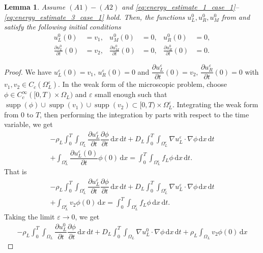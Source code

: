 \documentclass[11pt]{article}
\newtheorem{lemma}{Lemma}
\def\es{\varepsilon}
\def\oll{\Omega_L^\varepsilon}
\newcommand{\di}[1]{\,\mathrm{d}#1}
\begin{document}
\begin{lemma}\label{lemma:initial_condition}
     Assume $(A1)-(A2)$ and \eqref{eq:energy_estimate_1_case_1}--\eqref{eq:energy_estimate_3_case_1} hold. Then,  the functions $u_L^0,u_R^0,u_M^0$ from  and  satisfy the following initial conditions
    \begin{align*}
u_L^0(0) &= v_1, &
u_M^0(0) &= 0, &
u_R^0(0) &= 0, \\
\frac{\partial u_L^0}{\partial t}(0) &= v_2, &
\frac{\partial u_M^0}{\partial t}(0) &= 0, &
\frac{\partial u_R^0}{\partial t}(0) &= 0.
\end{align*}

\end{lemma}
\begin{proof}
    We have $u_L^\es(0)=v_1,\,u_R^\es(0)=0$ and $\dfrac{\partial u_L^\es}{\partial t}(0)=v_2, \,\dfrac{\partial u_R^\es}{\partial t}(0)=0$
    with $v_1,v_2\in C_c(\oll)$. In the weak form of the microscopic problem, choose $\phi\in C_c^\infty([0,T)\times \Omega_L)$ and  $\es$ small enough such that $\operatorname{supp}( \phi)\cup \operatorname{supp}( v_1)\cup \operatorname{supp}(v_2)\subset [0,T)\times \Omega_L^\es$. Integrating the weak form from $0$ to $T$, then performing the integration by parts with respect to the time variable, we get
    \begin{multline*}
    -\rho_L\int_0^T\int_{\oll}  \dfrac{\partial u_L^\es}{\partial t} \dfrac{\partial \phi}{\partial t} \di{x}\di{t}
    +D_L\int_0^T\int_{\oll}\nabla u_L^\es \cdot \nabla \phi   \di{x}\di{t} \\+\int_{\oll}  \dfrac{\partial u_L^\es(0)}{\partial t}  \phi(0)\di{x}
    = \int_0^T\int_{\oll} f_L\phi \di{x}\di{t}.
\end{multline*}
That is
\begin{multline}\label{eq:omega_l_weakform}
    -\rho_L\int_0^T\int_{\oll}  \dfrac{\partial u_L^\es}{\partial t} \dfrac{\partial \phi}{\partial t} \di{x}\di{t}
    +D_L\int_0^T\int_{\oll}\nabla u_L^\es \cdot \nabla \phi  \di{x}\di{t} \\+\int_{\oll}  v_2  \phi(0)\di{x}
    = \int_0^T\int_{\oll} f_L\phi \di{x}\di{t}.
\end{multline}
Taking the limit $\es\rightarrow 0$, we get
\begin{align*}
    -\rho_L\int_0^T\int_{\Omega_L}  \dfrac{\partial u_L^0}{\partial t} \dfrac{\partial \phi}{\partial t} \di{x}\di{t}
    +D_L\int_0^T\int_{\Omega_L}\nabla u_L^0 \cdot \nabla \phi  \di{x}\di{t} +\rho_L\int_{\Omega_L}  v_2  \phi(0) \di{x}

\end{align*}
\end{proof}
\end{document}
